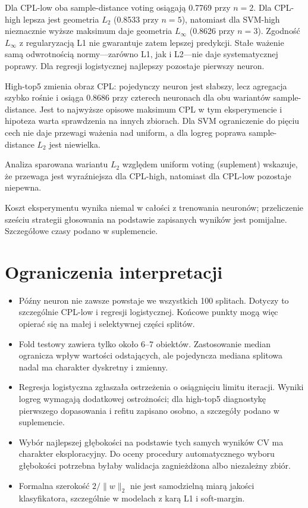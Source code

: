 \documentclass[11pt,a4paper]{article}
\begin{document}
Dla CPL-low oba sample-distance voting osiągają 0.7769 przy $n=2$. Dla CPL-high lepsza jest geometria $L_2$
(0.8533 przy $n=5$), natomiast dla SVM-high nieznacznie wyższe maksimum daje geometria $L_\infty$ (0.8626
przy $n=3$). Zgodność $L_\infty$ z regularyzacją L1 nie gwarantuje zatem lepszej predykcji. Stałe ważenie
samą odwrotnością normy---zarówno L1, jak i L2---nie daje systematycznej poprawy. Dla regresji logistycznej
najlepszy pozostaje pierwszy neuron.

High-top5 zmienia obraz CPL: pojedynczy neuron jest słabszy, lecz agregacja szybko rośnie i osiąga 0.8686
przy czterech neuronach dla obu wariantów sample-distance. Jest to najwyższe opisowe maksimum CPL w tym
eksperymencie i hipoteza warta sprawdzenia na innych zbiorach. Dla SVM ograniczenie do pięciu cech nie daje
przewagi ważenia nad uniform, a dla logreg poprawa sample-distance $L_2$ jest niewielka.

Analiza sparowana wariantu $L_2$ względem uniform voting (suplement) wskazuje, że przewaga jest wyraźniejsza
dla CPL-high, natomiast dla CPL-low pozostaje niepewna.

Koszt eksperymentu wynika niemal w całości z trenowania neuronów; przeliczenie sześciu strategii głosowania
na podstawie zapisanych wyników jest pomijalne. Szczegółowe czasy podano w suplemencie.

\section{Ograniczenia interpretacji}

\begin{itemize}
\item Późny neuron nie zawsze powstaje we wszystkich 100 splitach. Dotyczy to szczególnie CPL-low i regresji
logistycznej. Końcowe punkty mogą więc opierać się na małej i selektywnej części splitów.
\item Fold testowy zawiera tylko około 6--7 obiektów. Zastosowanie median ogranicza wpływ wartości odstających,
ale pojedyncza mediana splitowa nadal ma charakter dyskretny i zmienny.
\item Regresja logistyczna zgłaszała ostrzeżenia o osiągnięciu limitu iteracji. Wyniki logreg wymagają
dodatkowej ostrożności; dla high-top5 diagnostykę pierwszego dopasowania i refitu zapisano osobno, a
szczegóły podano w suplemencie.
\item Wybór najlepszej głębokości na podstawie tych samych wyników CV ma charakter eksploracyjny. Do oceny
procedury automatycznego wyboru głębokości potrzebna byłaby walidacja zagnieżdżona albo niezależny zbiór.
\item Formalna szerokość $2/\lVert w\rVert_2$ nie jest samodzielną miarą jakości klasyfikatora, szczególnie
w modelach z karą L1 i soft-margin.
\end{itemize}
\end{document}
